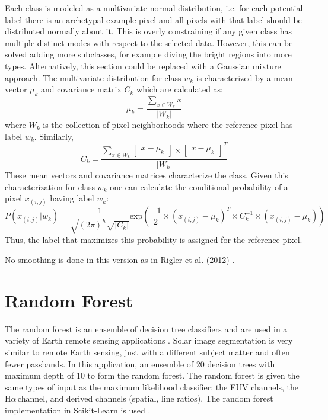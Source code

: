 \documentclass[twoside]{report}
\newcommand{\halpha}{H$\alpha$\,}
\begin{document}
Each class is modeled as a multivariate normal distribution, i.e. for each potential label there is an archetypal example pixel and all pixels with that label should be distributed normally about it. This is overly constraining if any given class has multiple distinct modes with respect to the selected data. However, this can be solved adding more subclasses, for example diving the bright regions into more types. Alternatively, this section could be replaced with a Gaussian mixture approach. The multivariate distribution for class $w_k$ is characterized by a mean vector $\mu_k$ and covariance matrix $C_k$ which are calculated as:
\[ \mu_k = \frac{\sum_{x \in W_k} x}{|W_k|} \]
where $W_k$ is the collection of pixel neighborhoods where the reference pixel has label $w_k$. Similarly,
\[ C_k = \frac{\sum_{x \in W_k} \begin{bmatrix} x - \mu_k \end{bmatrix} \times \begin{bmatrix} x - \mu_k \end{bmatrix}^T}{|W_k|} \]
These mean vectors and covariance matrices characterize the class. Given this characterization for class $w_k$ one can calculate the conditional probability of a pixel $x_{(i,j)}$ having label $w_k$:
\[ P(x_{(i,j)} | w_k) = \frac{1}{\sqrt{(2 \pi)^h} \sqrt{|C_k|}} \mathrm{exp} \left( \frac{-1}{2} \times \left(x_{(i,j)} - \mu_k \right)^T \times C_k^{-1} \times \left(x_{(i,j)} - \mu_k \right) \right) \]
Thus, the label that maximizes this probability is assigned for the reference pixel.

No smoothing is done in this version as in Rigler et al. (2012) \cite{rigler:2012}. 

\section{Random Forest}
The random forest is an ensemble of decision tree classifiers and are used in a variety of Earth remote sensing applications \cite{puissant2014object, salas2016multispectral, clark2016mapping, kulkarni2017multispectral, lowe:2015}. Solar image segmentation is very similar to remote Earth sensing, just with a different subject matter and often fewer passbands. In this application, an ensemble of 20 decision trees with maximum depth of 10 to form the random forest. The random forest is given the same types of input as the maximum likelihood classifier: the EUV channels, the \halpha channel, and derived channels (spatial, line ratios). The random forest implementation in Scikit-Learn is used \cite{scikit-learn}. 
\end{document}
